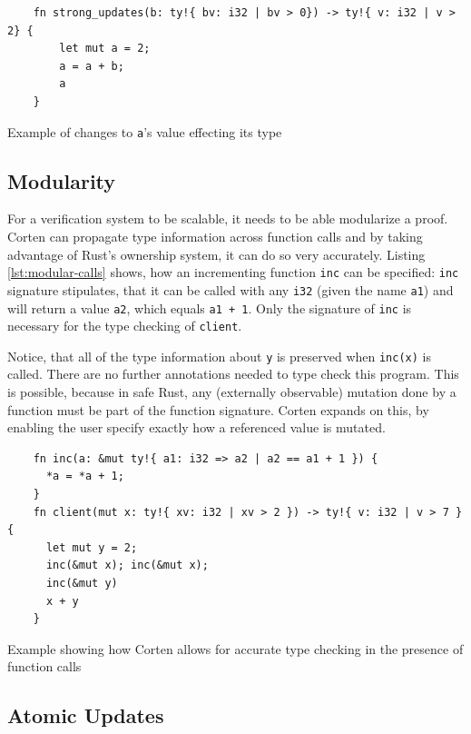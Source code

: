 \documentclass{book}
\newcommand{\code}[1]{\texttt{#1}}
\theoremstyle{definition}
\begin{document}
\begin{listing}[ht]
  \begin{verbatim}
    fn strong_updates(b: ty!{ bv: i32 | bv > 0}) -> ty!{ v: i32 | v > 2} {
        let mut a = 2;
        a = a + b;
        a
    }
  \end{verbatim}
  \caption{Example of changes to \code{a}'s value effecting its type}
  \label{lst:strong-updates}
\end{listing}



\label{sec:modularity}\subsection{Modularity}

For a verification system to be scalable, it needs to be able modularize a proof. Corten can propagate type information across function calls and by taking advantage of Rust's ownership system, it can do so very accurately. Listing \ref{lst:modular-calls} shows, how an incrementing function \code{inc} can be specified: \code{inc} signature stipulates, that it can be called with any \code{i32} (given the name \code{a1}) and will return a value \code{a2}, which equals \code{a1 + 1}. Only the signature of \code{inc} is necessary for the type checking of \code{client}. 

Notice, that all of the type information about \code{y} is preserved when \code{inc(x)} is called. There are no further annotations needed to type check this program. This is possible, because in safe Rust, any (externally observable) mutation done by a function must be part of the function signature. Corten expands on this, by enabling the user specify exactly how a referenced value is mutated.

\begin{listing}[ht]
  \begin{verbatim}
    fn inc(a: &mut ty!{ a1: i32 => a2 | a2 == a1 + 1 }) {
      *a = *a + 1;
    }
    fn client(mut x: ty!{ xv: i32 | xv > 2 }) -> ty!{ v: i32 | v > 7 } {
      let mut y = 2;
      inc(&mut x); inc(&mut x);
      inc(&mut y)
      x + y
    }
  \end{verbatim}
  \caption{Example showing how Corten allows for accurate type checking in the presence of function calls }
  \label{lst:modular-calls}
\end{listing}




\label{subsec:atomic-updates}\subsection{Atomic Updates}
\end{document}
